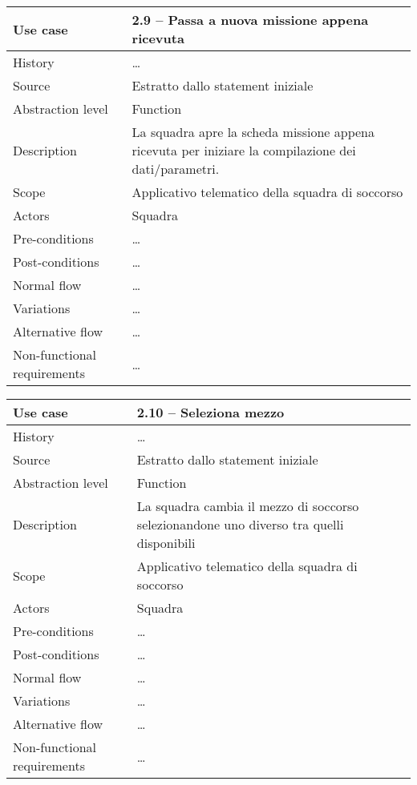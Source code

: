 \documentclass{article}
\begin{document}
    \begin{table}
        \begin{tabularx}{\textwidth}{l|X}
            Use case & 2.9 – Passa a nuova missione appena ricevuta\\
            \hline
            History & \dots \\
            Source & Estratto dallo statement iniziale\\
            Abstraction level & Function\\
            Description & La squadra apre la scheda missione appena ricevuta per iniziare la compilazione dei dati/parametri.\\
            Scope & Applicativo telematico della squadra di soccorso\\
            Actors & Squadra\\
            Pre-conditions & \dots \\
            Post-conditions & \dots \\
            Normal flow & \dots \\
            Variations & \dots \\
            Alternative flow & \dots \\
            Non-functional requirements & \dots
        \end{tabularx}
        \label{tab:usecase2.9}
    \end{table}

    \begin{table}
        \begin{tabularx}{\textwidth}{l|X}
            Use case & 2.10 – Seleziona mezzo\\
            \hline
            History & \dots \\
            Source & Estratto dallo statement iniziale\\
            Abstraction level & Function\\
            Description & La squadra cambia il mezzo di soccorso selezionandone uno diverso tra quelli disponibili\\
            Scope & Applicativo telematico della squadra di soccorso\\
            Actors & Squadra\\
            Pre-conditions & \dots \\
            Post-conditions & \dots \\
            Normal flow & \dots \\
            Variations & \dots \\
            Alternative flow & \dots \\
            Non-functional requirements & \dots
        \end{tabularx}
        \label{tab:usecase2.10}
    \end{table}
\end{document}
